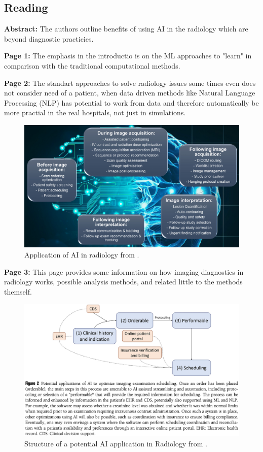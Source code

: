\subsection{Reading}
    \textbf{Abstract:}
    The authors outline benefits of using AI in the radiology which are beyond diagnostic practicies.
    

    
    \textbf{Page 1:}
    The emphasis in the introductio is on the ML approaches to "learn" in comparison with the traditional computational methods.
    
    \textbf{Page 2:}
    The standart approaches to solve radiology issues some times even does not consider need of a patient, when data driven methods like Natural Language Processing (NLP) has potential to work from data and therefore automatically be more practial in the real hospitals, not just in simulations.
    \begin{figure}[H]
        \centering
        \includegraphics[width=1\textwidth]{figures/SR0012US23/fig1.png}
        \caption{Application of AI in radiology from \cite{x076}.}
        \label{fig1:SR0012US23}
    \end{figure}

    \textbf{Page 3:}
    This page provides some information on how imaging diagnostics in radiology works, possible analysis methods, and related little to the methods themself.
    \begin{figure}[H]
        \centering
        \includegraphics[width=1\textwidth]{figures/SR0012US23/fig2.png}
        \caption{Structure of a potential AI application in Radiology from \cite{x076}.}
        \label{fig2:SR0012US23}
    \end{figure}

